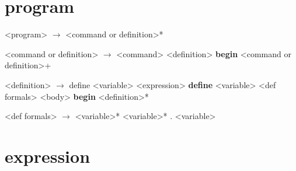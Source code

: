 \documentclass[10pt]{report}
\begin{document}
\section{program}

\begin{grammar}
  <program> $\longrightarrow$ <command or definition>*

  <command or definition> $\longrightarrow$ <command>
  \alt <definition>
  \alt \bop \textbf{begin} <command or definition>+ \bcp

  <definition> $\longrightarrow$ \bop define <variable> <expression> \bcp
  \alt \bop \textbf{define} \bop <variable> <def formals> \bcp <body> \bcp
  \alt \bop \textbf{begin} <definition>* \bcp

  <def formals> $\longrightarrow$ <variable>*
  \alt <variable>*  .  <variable>
\end{grammar}

\section{expression}
\end{document}

